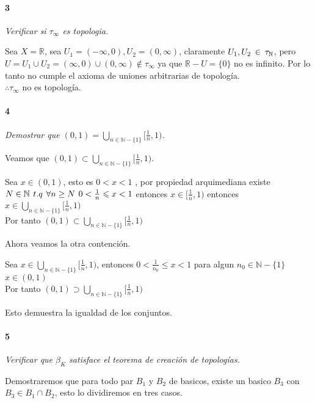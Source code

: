 \documentclass[12pt]{article}
\begin{document}
\paragraph{3}
\textit{Verificar si $\tau_{\infty}$ es topologia.} 

Sea $X=\mathbb{R}$, sea $U_1 = (-\infty,0),U_2 = (0,\infty)$, claramente $U_1,U_{2}\hspace{2px}\in\hspace{2px}\tau_{\mathbb{N}}$, pero $U=U_1\cup U_2 = (\infty,0)\cup(0,\infty)\notin \tau_{\infty}$
ya que $\mathbb{R}-U=\{0\}$ no es infinito. Por lo tanto no cumple el axioma de uniones arbitrarias de topología.\\ $\therefore\tau_{\infty}$ no es topología.\\

\paragraph{4}
\textit{Demostrar que $(0,1)=\bigcup\limits_{n\in\mathbb{N}-\{1\}}[\frac{1}{n},1)$.}

Veamos que $(0,1)\subset \bigcup\limits_{n\in\mathbb{N}-\{1\}}[\frac{1}{n},1)$.

Sea $x\in(0,1)$, esto es $0<x<1$ , por propiedad arquimediana existe $ N \in\mathbb{N}\hspace{4px}t.q \hspace{4px} \forall n\geq N \hspace{4px} 0< \frac{1}{n} \leqslant  x<1$ entonces $x\in[\frac{1}{n},1)$
entonces $x\in\bigcup\limits_{n\in\mathbb{N}-\{1\}}[\frac{1}{n},1)$\\Por tanto $(0,1)\subset\bigcup\limits_{n\in\mathbb{N}-\{1\}}[\frac{1}{n},1)$

Ahora veamos la otra contención.

Sea $x\in\bigcup\limits_{n\in\mathbb{N}-\{1\}}[\frac{1}{n},1)$, entonces $0<\frac{1}{n_0}\leq x<1$ para algun $n_0\in\mathbb{N}-\{1\}$\\$x\in(0,1)$\\ Por tanto $(0,1)\supset\bigcup\limits_{n\in\mathbb{N}-\{1\}}[\frac{1}{n},1)$

Esto demuestra la igualdad de los conjuntos.
\paragraph{5}
\textit{Verificar que $\beta_K$ satisface el teorema de creación de topologías.}

Demostraremos que para todo par $B_1$ y $B_2$ de basicos, existe un basico $B_3$ con $B_3\in B_1 \cap B_2$, esto lo dividiremos en tres casos.
\vspace{0.15cm}
\end{document}
